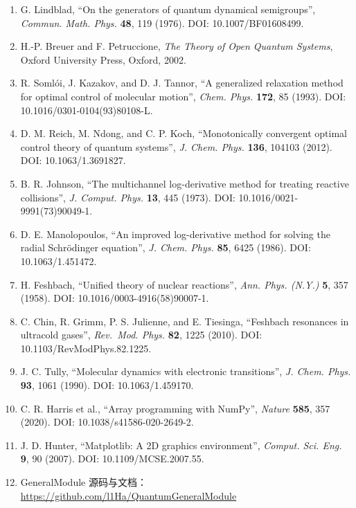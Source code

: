 \documentclass[
  a4paper,
]{ctexbook}
\begin{document}
\begin{enumerate}
  positive dynamical semigroups of N-level systems'', \emph{J. Math.
  Phys.} \textbf{17}, 821 (1976). DOI: 10.1063/1.522979.
\item
  G. Lindblad, ``On the generators of quantum dynamical semigroups'',
  \emph{Commun. Math. Phys.} \textbf{48}, 119 (1976). DOI:
  10.1007/BF01608499.
\item
  H.-P. Breuer and F. Petruccione, \emph{The Theory of Open Quantum
  Systems}, Oxford University Press, Oxford, 2002.
\item
  R. Somlói, J. Kazakov, and D. J. Tannor, ``A generalized relaxation
  method for optimal control of molecular motion'', \emph{Chem. Phys.}
  \textbf{172}, 85 (1993). DOI: 10.1016/0301-0104(93)80108-L.
\item
  D. M. Reich, M. Ndong, and C. P. Koch, ``Monotonically convergent
  optimal control theory of quantum systems'', \emph{J. Chem. Phys.}
  \textbf{136}, 104103 (2012). DOI: 10.1063/1.3691827.
\item
  B. R. Johnson, ``The multichannel log-derivative method for treating
  reactive collisions'', \emph{J. Comput. Phys.} \textbf{13}, 445
  (1973). DOI: 10.1016/0021-9991(73)90049-1.
\item
  D. E. Manolopoulos, ``An improved log-derivative method for solving
  the radial Schrödinger equation'', \emph{J. Chem. Phys.} \textbf{85},
  6425 (1986). DOI: 10.1063/1.451472.
\item
  H. Feshbach, ``Unified theory of nuclear reactions'', \emph{Ann. Phys.
  (N.Y.)} \textbf{5}, 357 (1958). DOI: 10.1016/0003-4916(58)90007-1.
\item
  C. Chin, R. Grimm, P. S. Julienne, and E. Tiesinga, ``Feshbach
  resonances in ultracold gases'', \emph{Rev.~Mod. Phys.} \textbf{82},
  1225 (2010). DOI: 10.1103/RevModPhys.82.1225.
\item
  J. C. Tully, ``Molecular dynamics with electronic transitions'',
  \emph{J. Chem. Phys.} \textbf{93}, 1061 (1990). DOI: 10.1063/1.459170.
\item
  C. R. Harris et al., ``Array programming with NumPy'', \emph{Nature}
  \textbf{585}, 357 (2020). DOI: 10.1038/s41586-020-2649-2.
\item
  J. D. Hunter, ``Matplotlib: A 2D graphics environment'', \emph{Comput.
  Sci. Eng.} \textbf{9}, 90 (2007). DOI: 10.1109/MCSE.2007.55.
\item
  GeneralModule
  源码与文档：\url{https://github.com/l1Ha/QuantumGeneralModule}
\end{enumerate}
\end{document}
